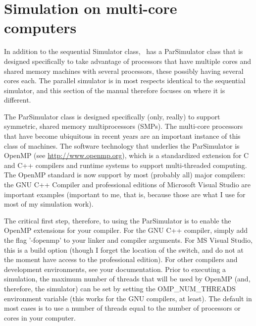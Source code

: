 \chapter{Simulation on multi-core computers}
In addition to the sequential Simulator class, \adevs\ has a ParSimulator class that is designed specifically to take advantage of processors that have multiple cores and shared memory machines with several processors, these possibly having several cores each. The parallel simulator is in most respects identical to the sequential simulator, and this section of the manual therefore focuses on where it is different.

The ParSimulator class is designed specifically (only, really) to support symmetric, shared memory multiprocessors (SMPs). The multi-core processors that have become ubiquitous in recent years are an important instance of this class of machines. The software technology that underlies the ParSimulator is OpenMP (see \url{http://www.openmp.org}), which is a standardized extension for C and C++ compilers and runtime systems to support multi-threaded computing. The OpenMP standard is now support by most (probably all) major compilers: the GNU C++ Compiler and professional editions of Microsoft Visual Studio are important examples (important to me, that is, because those are what I use for most of my simulation work).

The critical first step, therefore, to using the ParSimulator is to enable the OpenMP extensions for your compiler. For the GNU C++ compiler, simply add the flag '-fopenmp' to your linker and compiler arguments. For MS Visual Studio, this is a build option (though I forget the location of the switch, and do not at the moment have access to the professional edition). For other compilers and development environments, see your documentation. Prior to executing a simulation, the maximum number of threads that will be used by OpenMP (and, therefore, the simulator) can be set by setting the OMP\_NUM\_THREADS environment variable (this works for the GNU compilers, at least). The default in most cases is to use a number of threads equal to the number of processors or cores in your computer.


